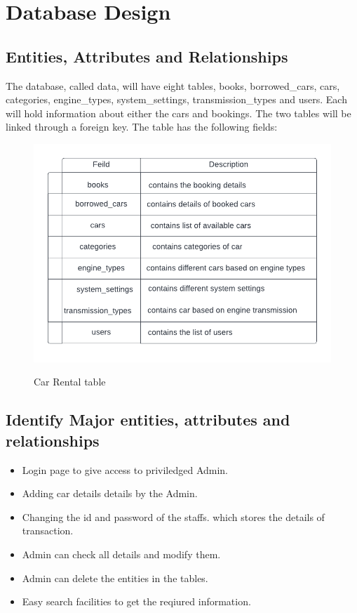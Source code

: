 \chapter{Database Design}
\section{Entities, Attributes and Relationships}
The database, called data, will have eight tables, books, borrowed\_cars, cars, categories, engine\_types, system\_settings, transmission\_types and users. Each will hold information about either the cars and bookings. The two
tables will be linked through a foreign key. The  table has the following fields:\\
\begin{figure}[H]
\centering
\caption{Car Rental table}
\includegraphics[scale=.9]{./Blank Diagram}
\\[0.2in]
\label{fig:Car Rental}
\end{figure}


\section{Identify Major entities, attributes and relationships}
\begin{itemize}
\item Login page to give access to priviledged Admin.
\item Adding car details details by the Admin.
\item Changing the id and password of the staffs.
which stores the details of transaction.
\item Admin can check all details  and modify them.
\item Admin can delete the entities in the tables.
\item Easy  search facilities to get the reqiured information.
\end{itemize}
